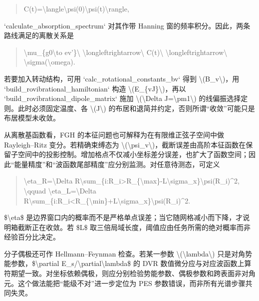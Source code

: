 \documentclass[UTF8,openany,11pt,fontset=fandol]{ctexbook}
\begin{document}
\begin{quote}
C(t)=\textbackslash langle\textbackslash psi(0)\textbar\textbackslash psi(t)\textbackslash rangle,
\end{quote}

`calculate\_absorption\_spectrum` 对其作带 Hanning
窗的频率积分。因此，两条路线满足的离散关系是

\begin{quote}
\textbackslash mu\_\{g0\textbackslash to ev'\}\textbackslash{}
\textbackslash longleftrightarrow\textbackslash{} C(t)\textbackslash{}
\textbackslash longleftrightarrow\textbackslash{}
\textbackslash sigma(\textbackslash omega).
\end{quote}

若要加入转动结构，可用 `calc\_rotational\_constants\_bv` 得到
\textbackslash(B\_v\textbackslash)，用
`build\_rovibrational\_hamiltonian` 构造
\textbackslash(E\_\{vJ\}\textbackslash)，再以
`build\_rovibrational\_dipole\_matrix` 施加
\textbackslash(\textbackslash Delta J=\textbackslash pm1\textbackslash)
的线偏振选择定则。此时必须固定温度、各 \textbackslash(J\textbackslash)
的布居和退简并约定，否则所谓``收敛''可能只是布居模型未收敛。

从离散基函数看，FGH 的本征问题也可解释为在有限维正弦子空间中做
Rayleigh--Ritz 变分。若精确束缚态为
\textbackslash(\textbackslash psi\_v\textbackslash)，截断误差由高阶本征函数在保留子空间中的投影控制。增加格点不仅减小坐标差分误差，也扩大了函数空间；因此``能量精度''和``波函数尾部精度''应分别监测。对任意待测态，可定义

\begin{quote}
\textbackslash eta\_R=\textbackslash Delta
R\textbackslash sum\_\{i:R\_i\textgreater R\_\{\textbackslash max\}-L\textbackslash sigma\_x\}\textbar\textbackslash psi(R\_i)\textbar\^{}2,
\textbackslash qquad \textbackslash eta\_L=\textbackslash Delta
R\textbackslash sum\_\{i:R\_i\textless R\_\{\textbackslash min\}+L\textbackslash sigma\_x\}\textbar\textbackslash psi(R\_i)\textbar\^{}2.
\end{quote}

\$\textbackslash eta\$
是边界窗口内的概率而不是严格单点误差；当它随网格减小而下降，才说明箱截断正在收敛。若
\$L\$ 取三倍局域长度，阈值应由任务所需的绝对概率而非经验百分比决定。

分子偶极还可作 Hellmann--Feynman 检查。若某一参数
\textbackslash(\textbackslash lambda\textbackslash)
只是对角势能参数，\$\textbackslash partial
E\_s/\textbackslash partial\textbackslash lambda\$ 的 DVR
数值微分应与对应波函数上算符期望一致。对坐标依赖偶极，则应分别检验势能参数、偶极参数和跨表面非对角元。这个做法能把``能级不对''进一步定位为
PES 参数错误，而非所有光谱步骤共同失灵。
\end{document}
